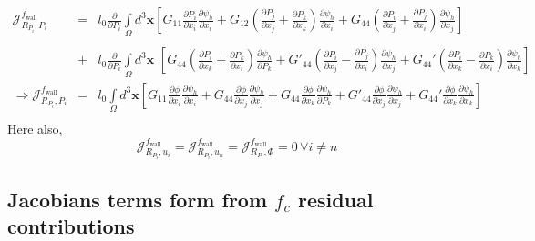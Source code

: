 \documentclass[16pt]{article} %
\begin{document}
\begin{eqnarray}\nonumber
\mathscr{J}_{R_{P_i},P_i}^{f_\mathrm{wall}} &=&l_0 \frac{\partial}{\partial P_i} \int\limits_\Omega d^3 {\boldsymbol x} \left[G_{11} \frac{\partial P_i}{\partial x_i} \frac{\partial \psi_h}{\partial x_i} + G_{12} \left(\frac{\partial P_j}{\partial x_j} + \frac{\partial P_k}{\partial x_k} \right) \frac{\partial \psi_h}{\partial x_i} + G_{44} \left(\frac{\partial P_i}{\partial x_j} + \frac{\partial P_j}{\partial x_i} \right)\frac{\partial \psi_h}{\partial x_j} \right]\\ \nonumber\\ \nonumber
&+&l_0 \frac{\partial}{\partial P_i} \int\limits_\Omega d^3 {\boldsymbol x} \,\,\left[ G_{44} \left(\frac{\partial P_i}{\partial x_k} + \frac{\partial P_k}{\partial x_i} \right) \frac{\partial \psi_h}{\partial P_k} + G'_{44} \left(\frac{\partial P_i}{\partial x_j}  - \frac{\partial P_j}{\partial x_i}\right) \frac{\partial \psi_h}{\partial x_j} + G_{44}' \left(\frac{\partial P_i}{\partial x_k} - \frac{\partial P_k}{\partial x_i} \right) \frac{\partial \psi_h}{\partial x_k}\right]\\ \nonumber
 \Rightarrow \mathscr{J}_{R_{P_i},P_i}^{f_\mathrm{wall}} &=& l_0 \int\limits_\Omega d^3 {\boldsymbol x} \left[G_{11} \frac{\partial \phi}{\partial x_i} \frac{\partial \psi_h}{\partial x_i}  + G_{44} \frac{\partial \phi}{\partial x_j} \frac{\partial \psi_h}{\partial x_j}  +  G_{44} \frac{\partial \phi}{\partial x_k}  \frac{\partial \psi_h}{\partial P_k} + G'_{44} \frac{\partial \phi}{\partial x_j} \frac{\partial \psi_h}{\partial x_j} + G_{44}' \frac{\partial \phi}{\partial x_k}  \frac{\partial \psi_h}{\partial x_k}\right]\\ \nonumber
\end{eqnarray}
Here also, 
$$\mathscr{J}_{R_{P_i} , u_i}^{f_\mathrm{wall}} = \mathscr{J}_{R_{P_i} , u_n}^{f_\mathrm{wall}} = \mathscr{J}_{R_{P_i} , \Phi}^{f_\mathrm{wall}} = 0 \,\forall i \neq n $$

\newpage
\subsection{Jacobians terms form from $f_c$ residual contributions}
\end{document}

